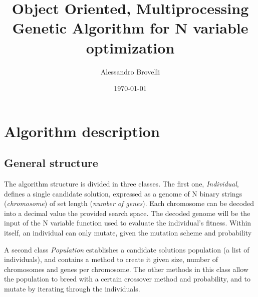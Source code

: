 \documentclass[twocolumn]{article}
\title{Object Oriented, Multiprocessing Genetic Algorithm for N variable optimization}
\author{Alessandro Brovelli}
\date{\today}
\begin{document}

\section{Algorithm description}
\subsection{General structure}
The algorithm structure is divided in three classes. The first one, \textit{Individual}, defines a single candidate solution, expressed as a genome of N binary strings (\textit{chromosome}) of set length (\textit{number of genes}). Each chromosome can be decoded into a decimal value  the provided search space. The decoded genome will be the input of the N variable function used to evaluate the individual's fitness. Within itself, an individual can only mutate, given the mutation scheme and probability

A second class \textit{Population} establishes a candidate solutions population (a list of individuals), and contains a method to create it given size, number of chromosomes and genes per chromosome. The other methods in this class allow the population to breed with a certain crossover method and probability, and to mutate by iterating through the individuals.
\end{document}
